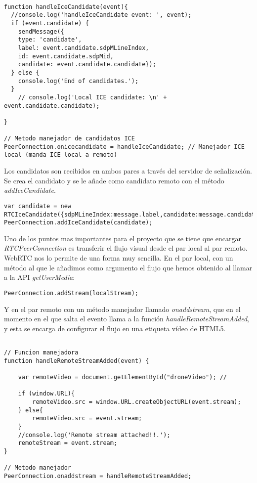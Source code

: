\begin{lstlisting}[caption=Manejador de los Candidatos ICE locales.]

function handleIceCandidate(event){
  //console.log('handleIceCandidate event: ', event);
  if (event.candidate) {
    sendMessage({
    type: 'candidate',
    label: event.candidate.sdpMLineIndex,
    id: event.candidate.sdpMid,
    candidate: event.candidate.candidate});
  } else {
    console.log('End of candidates.');
  }
    // console.log('Local ICE candidate: \n' + event.candidate.candidate);
  
}

// Metodo manejador de candidatos ICE
PeerConnection.onicecandidate = handleIceCandidate; // Manejador ICE local (manda ICE local a remoto)

\end{lstlisting}

Los candidatos son recibidos en ambos pares a través del servidor de señalización. Se crea el candidato y se le añade como candidato remoto con el método \emph{addIceCandidate}.\\

\begin{lstlisting}[caption=Manejador de los Candidatos ICE remotos.]
var candidate = new RTCIceCandidate({sdpMLineIndex:message.label,candidate:message.candidate});
PeerConnection.addIceCandidate(candidate);
\end{lstlisting}


Uno de los puntos mas importantes para el proyecto que se tiene que encargar \emph{RTCPeerConnection} es transferir el flujo visual desde el par local al par remoto. WebRTC nos lo permite de una forma muy sencilla. En el par local, con un método al que le añadimos como argumento el flujo que hemos obtenido al llamar a la API \emph{getUserMedia}:\\

\begin{lstlisting}[caption=Manejador del flujo audiovisual en el par local.]
PeerConnection.addStream(localStream); 
\end{lstlisting}

Y en el par remoto con un método manejador llamado \emph{onaddstream}, que en el momento en el que salta el evento llama a la función \emph{handleRemoteStreamAdded}, y esta se encarga de configurar el flujo en una etiqueta vídeo de HTML5.\\

\begin{lstlisting}[caption=Manejador del flujo audiovisual en el par remoto.]

// Funcion manejadora
function handleRemoteStreamAdded(event) {

    var remoteVideo = document.getElementById("droneVideo"); // 

	if (window.URL){
		remoteVideo.src = window.URL.createObjectURL(event.stream);
	} else{
		remoteVideo.src = event.stream;
	}
    //console.log('Remote stream attached!!.');
	remoteStream = event.stream;
}

// Metodo manejador 
PeerConnection.onaddstream = handleRemoteStreamAdded;
\end{lstlisting}

